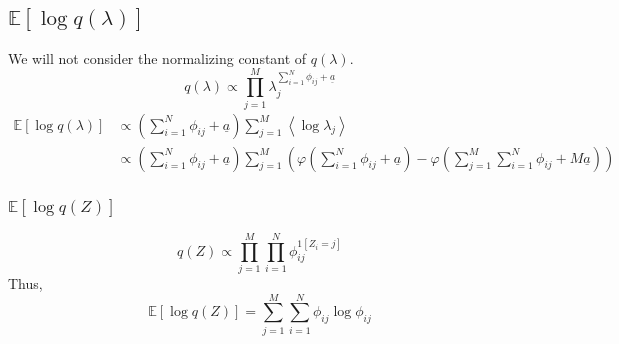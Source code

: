 \documentclass[11pt]{article}
\begin{document}
\subsection{$\mathbb{E}\left[\log q\left(\lambda\right)\right]$}
We will not consider the normalizing constant of $q\left(\lambda\right)$.
$$
  q\left(\lambda\right) \propto \prod_{j=1}^{M}\lambda_{j}^{\sum_{i=1}^{N}\phi_{ij} + \underline{a}}
$$
\begin{align*}
  \mathbb{E}\left[\log q\left(\lambda\right)\right] &\propto \left(\sum_{i=1}^{N}\phi_{ij}+\underline{a}\right) \sum_{j=1}^{M}\left\langle \log \lambda_{j}\right\rangle \\
  &\propto \left(\sum_{i=1}^{N}\phi_{ij}+\underline{a}\right) \sum_{j=1}^{M} \left(\varphi\left(\sum_{i=1}^{N}\phi_{ij}+\underline{a}\right)-\varphi\left(\sum_{j=1}^{M}\sum_{i=1}^{N}\phi_{ij}+M\underline{a}\right)\right)
\end{align*}
\subsubsection{$\mathbb{E}\left[\log q\left(Z\right)\right]$}
$$
  q\left(Z\right) \propto \prod_{j=1}^{M}\prod_{i=1}^{N}\phi_{ij}^{1\left[Z_{i}=j\right]}
$$
Thus,
$$
  \mathbb{E}\left[\log q\left(Z\right)\right] = \sum_{j=1}^{M}\sum_{i=1}^{N}\phi_{ij}\log \phi_{ij}
$$
\end{document}
